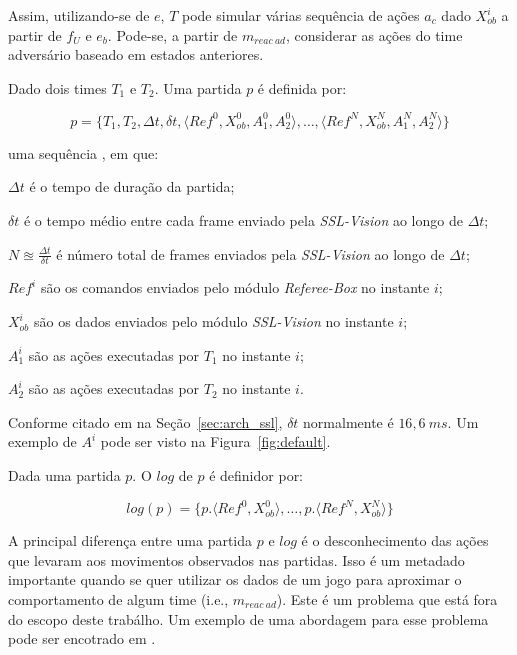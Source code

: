  Assim, utilizando-se de $e$, $T$ pode simular várias sequência de ações $a_c$ dado $X_{ob}^{i}$
  a partir de $f_{U}$ e $e_b$. Pode-se, a partir de $m_{reac{\ }ad}$, considerar as ações do time
  adversário baseado em estados anteriores.

\begin{defi}[Partida]
  Dado dois times $T_1$ e $T_2$. Uma partida $p$ é definida por:

  \[
   p = \lbrace T_1, T_2, \Delta t, \delta t, \langle Ref^{0}, X_{ob}^{0}, A_1^{0}, A_2^{0}\rangle, 
    \dots, \langle Ref^{N}, X_{ob}^{N}, A_1^{N}, A_2^{N} \rangle \rbrace
 \]

  uma sequência , em que:
  \begin{description}
    \item $\Delta t$ é o tempo de duração da partida;
    \item $\delta t$ é o tempo médio entre cada frame enviado pela \textit{SSL-Vision} ao longo de $\Delta t$;
    \item $N \approxeq \frac{\Delta t}{\delta t}$ é número total de frames enviados pela \textit{SSL-Vision}
  ao longo de $\Delta t$;
    \item $Ref^{i}$ são os comandos enviados pelo módulo \textit{Referee-Box} no instante $i$;
    \item $X_{ob}^{i}$ são os dados enviados pelo módulo \textit{SSL-Vision} no instante $i$;
    \item $A_1^{i}$ são as ações executadas por $T_1$ no instante $i$;
    \item $A_2^{i}$ são as ações executadas por $T_2$ no instante $i$.
  \end{description}
\end{defi}

  Conforme citado em na Seção~\ref{sec:arch_ssl}, $\delta t$ normalmente é $16,6{\ }ms$.
  Um exemplo de $A^{i}$ pode ser visto na Figura~\ref{fig:default}.

\begin{defi}[Logs]
  Dada uma partida $p$. O $log$ de $p$ é definidor por:

  \[
    log(p) = \lbrace p.\langle Ref^{0}, X_{ob}^{0}\rangle, \dots, p.\langle Ref^{N}, X_{ob}^{N}\rangle \rbrace
  \]
\end{defi}
 
  A principal diferença entre uma partida $p$ e $log$ é o desconhecimento das ações que levaram
  aos movimentos observados nas partidas. Isso é um metadado importante quando se quer utilizar
  os dados de um jogo para aproximar o comportamento de algum time (i.e., $m_{reac{\ }ad}$).
  Este é um problema que está fora do escopo deste trabálho. Um exemplo de uma abordagem para
  esse problema pode ser encotrado em \cite{vail2008crf}.
